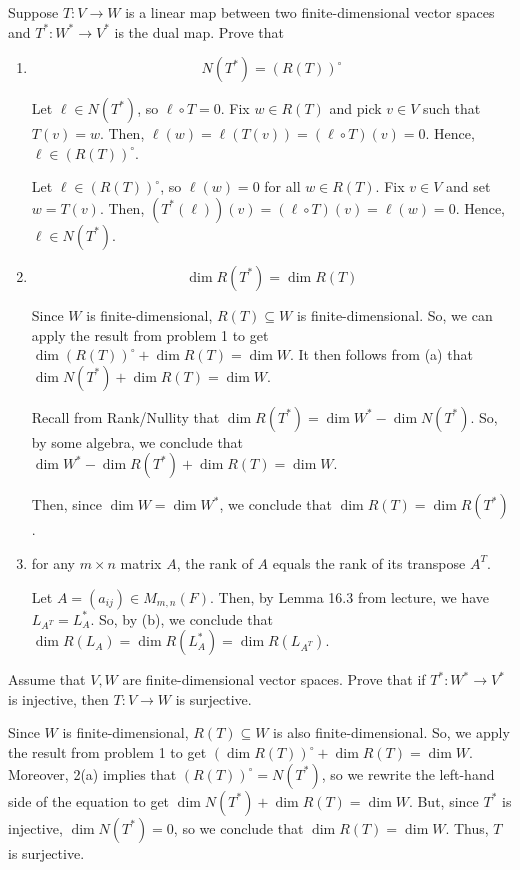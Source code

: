 \documentclass{article}
\begin{document}
\begin{problem}
Suppose $T : V \to W$ is a linear map between two finite-dimensional vector spaces and $T^* : W^* \to V^*$ is the dual map.
Prove that
\begin{enumerate}[label=(\alph*)]
	\item \[N(T^*) = (R(T))^\circ\]
	      \begin{solution}
		      Let $\ell \in N(T^*)$, so $\ell \circ T = 0$.
		      Fix $w \in R(T)$ and pick $v \in V$ such that $T(v) = w$.
		      Then, $\ell(w) = \ell(T(v)) = (\ell \circ T)(v) = 0$.
		      Hence, $\ell \in (R(T))^\circ$.

		      Let $\ell \in (R(T))^\circ$, so $\ell(w) = 0$ for all $w \in R(T)$.
		      Fix $v \in V$ and set $w = T(v)$.
		      Then, $(T^*(\ell))(v) = (\ell \circ T)(v) = \ell(w) = 0$.
		      Hence, $\ell \in N(T^*)$.
	      \end{solution}

	\item \[\dim R(T^*) = \dim R(T)\]
	      \begin{solution}
		      Since $W$ is finite-dimensional, $R(T) \subseteq W$ is finite-dimensional.
		      So, we can apply the result from problem 1 to get $\dim (R(T))^\circ + \dim R(T) = \dim W$.
		      It then follows from (a) that $\dim N(T^*) + \dim R(T) = \dim W$.

		      Recall from Rank/Nullity that $\dim R(T^*) = \dim W^* - \dim N(T^*)$.
		      So, by some algebra, we conclude that $\dim W^* - \dim R(T^*) + \dim R(T) = \dim W$.

		      Then, since $\dim W = \dim W^*$, we conclude that $\dim R(T) = \dim R(T^*)$.
	      \end{solution}

	\item for any $m \times n$ matrix $A$, the rank of $A$ equals the rank of its transpose $A^T$.
	      \begin{solution}
		      Let $A = (a_{ij}) \in M_{m, n}(F)$.
		      Then, by Lemma 16.3 from lecture, we have $L_{A^T} = L_A^*$.
		      So, by (b), we conclude that $\dim R(L_A) = \dim R(L_A^*) = \dim R(L_{A^T})$.
	      \end{solution}
\end{enumerate}
\end{problem}

\newpage

\begin{problem}
Assume that $V, W$ are finite-dimensional vector spaces.
Prove that if $T^* : W^* \to V^*$ is injective, then $T: V \to W$ is surjective.
\end{problem}
\begin{solution}
	Since $W$ is finite-dimensional, $R(T) \subseteq W$ is also finite-dimensional.
	So, we apply the result from problem 1 to get $(\dim R(T))^\circ + \dim R(T) = \dim W$.
	Moreover, 2(a) implies that $(R(T))^\circ = N(T^*)$, so we rewrite the left-hand side of the equation to get
	$\dim N(T^*) + \dim R(T) = \dim W$.
	But, since $T^*$ is injective, $\dim N(T^*) = 0$, so we conclude that $\dim R(T) = \dim W$.
	Thus, $T$ is surjective.
\end{solution}
\end{document}
